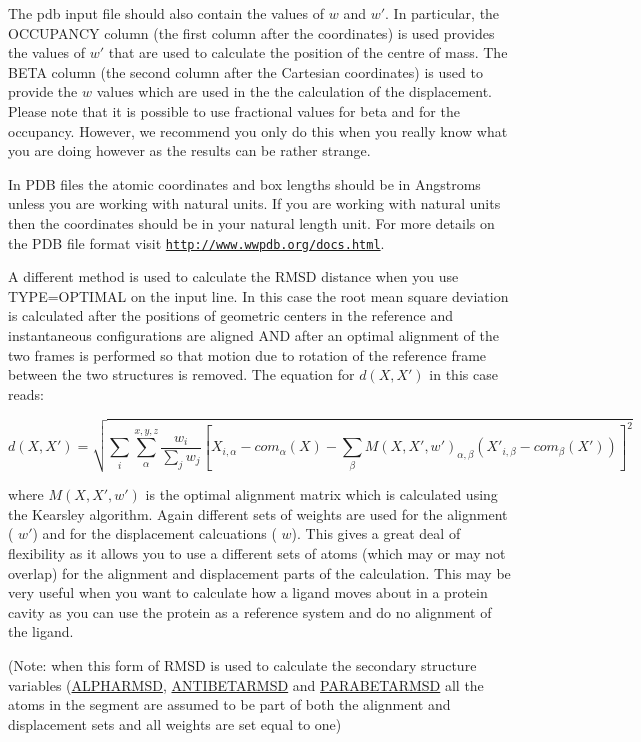 The pdb input file should also contain the values of $w$ and $w'$. In particular, the O\+C\+C\+U\+P\+A\+N\+C\+Y column (the first column after the coordinates) is used provides the values of $ w'$ that are used to calculate the position of the centre of mass. The B\+E\+T\+A column (the second column after the Cartesian coordinates) is used to provide the $ w $ values which are used in the the calculation of the displacement. Please note that it is possible to use fractional values for beta and for the occupancy. However, we recommend you only do this when you really know what you are doing however as the results can be rather strange.

In P\+D\+B files the atomic coordinates and box lengths should be in Angstroms unless you are working with natural units. If you are working with natural units then the coordinates should be in your natural length unit. For more details on the P\+D\+B file format visit \href{http://www.wwpdb.org/docs.html}{\tt http\+://www.\+wwpdb.\+org/docs.\+html}.

A different method is used to calculate the R\+M\+S\+D distance when you use T\+Y\+P\+E=O\+P\+T\+I\+M\+A\+L on the input line. In this case the root mean square deviation is calculated after the positions of geometric centers in the reference and instantaneous configurations are aligned A\+N\+D after an optimal alignment of the two frames is performed so that motion due to rotation of the reference frame between the two structures is removed. The equation for $d(X,X')$ in this case reads\+:

\[ d(X,X') = \sqrt{ \sum_i \sum_\alpha^{x,y,z} \frac{w_i}{\sum_j w_j}[ X_{i,\alpha}-com_\alpha(X)- \sum_\beta M(X,X',w')_{\alpha,\beta}({X'}_{i,\beta}-com_\beta(X')) ]^2 } \]

where $ M(X,X',w') $ is the optimal alignment matrix which is calculated using the Kearsley \cite{kearsley} algorithm. Again different sets of weights are used for the alignment ( $w'$) and for the displacement calcuations ( $w$). This gives a great deal of flexibility as it allows you to use a different sets of atoms (which may or may not overlap) for the alignment and displacement parts of the calculation. This may be very useful when you want to calculate how a ligand moves about in a protein cavity as you can use the protein as a reference system and do no alignment of the ligand.

(Note\+: when this form of R\+M\+S\+D is used to calculate the secondary structure variables (\hyperlink{ALPHARMSD}{A\+L\+P\+H\+A\+R\+M\+S\+D}, \hyperlink{ANTIBETARMSD}{A\+N\+T\+I\+B\+E\+T\+A\+R\+M\+S\+D} and \hyperlink{PARABETARMSD}{P\+A\+R\+A\+B\+E\+T\+A\+R\+M\+S\+D} all the atoms in the segment are assumed to be part of both the alignment and displacement sets and all weights are set equal to one)

